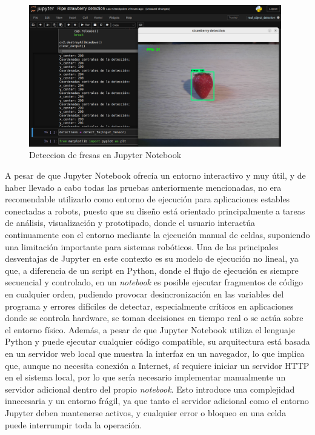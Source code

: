   \begin{figure}[H]
     \centering
     \begin{center}
       \includegraphics[width=11cm]{figs/Coordenadas centrales deteccion JN.png}
     \end{center}
     \caption{Deteccion de fresas en Jupyter Notebook}
    \label{fig:Coord_JN}
  \end{figure}

A pesar de que Jupyter Notebook ofrecía un entorno interactivo y muy útil, y de haber llevado a cabo todas las pruebas anteriormente mencionadas, no era recomendable utilizarlo como entorno de ejecución para aplicaciones estables conectadas a robots, puesto que su diseño está orientado principalmente a tareas de análisis, visualización y prototipado, donde el usuario interactúa continuamente con el entorno mediante la ejecución manual de celdas, suponiendo una limitación importante para sistemas robóticos. Una de las principales desventajas de Jupyter en este contexto es su modelo de ejecución no lineal, ya que, a diferencia de un script en Python, donde el flujo de ejecución es siempre secuencial y controlado, en un \textit{notebook} es posible ejecutar fragmentos de código en cualquier orden, pudiendo provocar desincronización en las variables del programa y errores difíciles de detectar, especialmente críticos en aplicaciones donde se controla hardware, se toman decisiones en tiempo real o se actúa sobre el entorno físico. Además, a pesar de que Jupyter Notebook utiliza el lenguaje Python y puede ejecutar cualquier código compatible, su arquitectura está basada en un servidor web local que muestra la interfaz en un navegador, lo que implica que, aunque no necesita conexión a Internet, sí requiere iniciar un servidor HTTP en el sistema local, por lo que sería necesario implementar manualmente un servidor adicional dentro del propio \textit{notebook}. Esto introduce una complejidad innecesaria y un entorno frágil, ya que tanto el servidor adicional como el entorno Jupyter deben mantenerse activos, y cualquier error o bloqueo en una celda puede interrumpir toda la operación.\\

